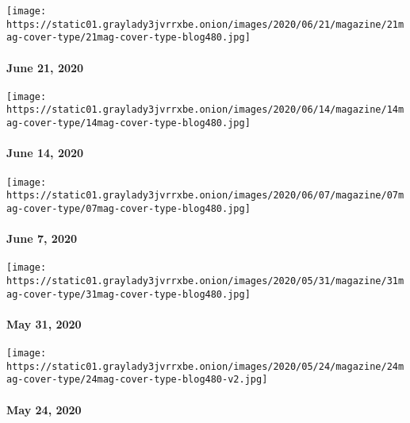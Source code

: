 \texttt{[image: https://static01.graylady3jvrrxbe.onion/images/2020/06/21/magazine/21mag-cover-type/21mag-cover-type-blog480.jpg]}

\hypertarget{june-21-2020}{%
\paragraph{June 21, 2020}\label{june-21-2020}}

\href{https://www.nytimes3xbfgragh.onion/issue/magazine/2020/06/12/the-61420-issue}{}

\texttt{[image: https://static01.graylady3jvrrxbe.onion/images/2020/06/14/magazine/14mag-cover-type/14mag-cover-type-blog480.jpg]}

\hypertarget{june-14-2020}{%
\paragraph{June 14, 2020}\label{june-14-2020}}

\href{https://www.nytimes3xbfgragh.onion/issue/magazine/2020/06/05/the-6720-issue}{}

\texttt{[image: https://static01.graylady3jvrrxbe.onion/images/2020/06/07/magazine/07mag-cover-type/07mag-cover-type-blog480.jpg]}

\hypertarget{june-7-2020}{%
\paragraph{June 7, 2020}\label{june-7-2020}}

\href{https://www.nytimes3xbfgragh.onion/issue/magazine/2020/05/29/the-53120-issue}{}

\texttt{[image: https://static01.graylady3jvrrxbe.onion/images/2020/05/31/magazine/31mag-cover-type/31mag-cover-type-blog480.jpg]}

\hypertarget{may-31-2020}{%
\paragraph{May 31, 2020}\label{may-31-2020}}

\href{https://www.nytimes3xbfgragh.onion/issue/magazine/2020/05/22/the-52420-issue}{}

\texttt{[image: https://static01.graylady3jvrrxbe.onion/images/2020/05/24/magazine/24mag-cover-type/24mag-cover-type-blog480-v2.jpg]}

\hypertarget{may-24-2020}{%
\paragraph{May 24, 2020}\label{may-24-2020}}

